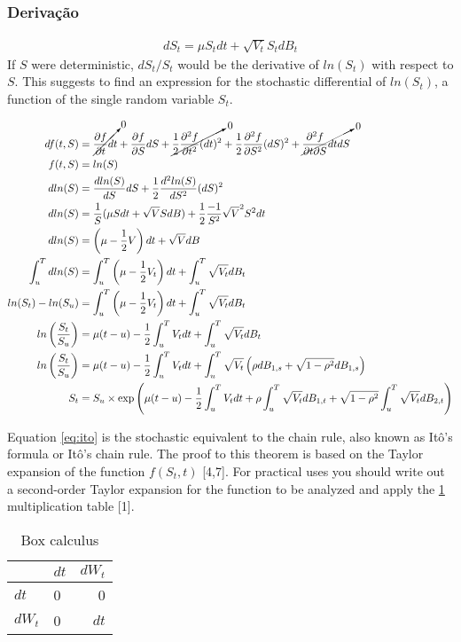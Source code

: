 \documentclass[12pt,twoside]{reedthesis}
\theoremstyle{definition}
\theoremstyle{definition}
\theoremstyle{remark}
\begin{document}
  \subsubsection{Derivação}\label{derivacao}
  \begin{align}
  dS_t = \mu S_t dt + \sqrt{V_t} S_t dB_t
  \end{align}
  If \(S\) were deterministic, \(dS_t/S_t\) would be the derivative of
  \(ln(S_t)\) with respect to \(S\). This suggests to find an expression
  for the stochastic differential of \(ln(S_t)\), a function of the single
  random variable \(S_t\).
  \begin{scriptsize}
  \begin{align}
  df(t,S) &= \cancelto{0}{\frac{\partial f}{\partial t}dt}  + \frac{\partial f}{\partial S} dS + \cancelto{0}{\frac{1}{2} \frac{\partial^2 f}{\partial t^2} (dt)^2} + \frac{1}{2} \frac{\partial^2 f}{\partial S^2} (dS)^2  + \cancelto{0}{\frac{\partial^2 f}{\partial t \partial S} dt dS} \\
  f(t,S) &= ln(S) \\
  dln(S) &= \frac{dln(S)}{dS} dS + \frac{1}{2} \frac{d^2ln(S)}{dS^2}(dS)^2 \\
  dln(S) &= \frac{1}{S} (\mu S dt + \sqrt{V} S dB) + \frac{1}{2}\frac{-1}{S^2}\sqrt{V}^2 S^2 dt \\
  dln(S) &= \left( \mu -  \frac{1}{2} V \right) dt + \sqrt{V} dB \\
  \int_{u}^{T}{dln(S)} &= \int_{u}^{T}{\left( \mu - \frac{1}{2} V_t \right) dt} + \int_{u}^{T}{\sqrt{V_t}dB_t} \\
  ln(S_t) - ln(S_u) &= \int_{u}^{T}{\left( \mu - \frac{1}{2} V_t \right) dt} + \int_{u}^{T}{\sqrt{V_t}dB_t} \\
  ln \left( \frac{S_t}{S_u} \right) &= \mu (t-u) - \frac{1}{2}\int_{u}^{T}{V_t dt} + \int_{u}^{T}{\sqrt{V_t} dB_t} \\
  ln \left( \frac{S_t}{S_u} \right) &= \mu (t-u) - \frac{1}{2}\int_{u}^{T}{V_t dt} + \int_{u}^{T}{\sqrt{V_t} \left(\rho dB_{1,s} + \sqrt{1-\rho^2} dB_{1,s} \right)} \\
  S_t &= S_u \times \exp \left( \mu (t-u) - \frac{1}{2} \int_{u}^{T}{V_t dt} + \rho \int_{u}^{T}{\sqrt{V_t}dB_{1,t}}+ \sqrt{1 - \rho^2} \int_{u}^{T}{\sqrt{V_t}dB_{2,t}} \right)
  \end{align}
  \end{scriptsize}
  Equation \eqref{eq:ito} is the stochastic equivalent to the chain rule,
  also known as Itô's formula or Itô's chain rule. The proof to this
  theorem is based on the Taylor expansion of the function \(f(S_t, t)\)
  {[}4,7{]}. For practical uses you should write out a second-order Taylor
  expansion for the function to be analyzed and apply the
  \ref{tab:box-calc} multiplication table {[}1{]}.
  \begin{longtable}[t]{llr}
  \caption{\label{tab:box-calc}Box calculus}\\
  \toprule
    & $dt$ & $dW_t$\\
  \midrule
  $dt$ & 0 & 0\\
  $dW_t$ & 0 & $dt$\\
  \bottomrule
  \end{longtable}
\end{document}
